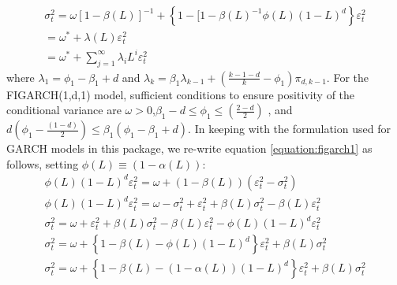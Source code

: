 \begin{equation}\label{equation:figarch1}
\begin{array}{l}
\sigma _t^2 = \omega {\left[ {1 - \beta \left( L \right)} \right]^{ - 1}} + \left\{ {1 - [1 - \beta {{\left( L \right)}^{ - 1}}\phi \left( L \right){{\left( {1 - L} \right)}^d}} \right\}\varepsilon _t^2\\
 = {\omega ^*} + \lambda \left( L \right)\varepsilon _t^2\\
 = {\omega ^*} + \sum\limits_{j = 1}^\infty  {{\lambda _i}{L^i}\varepsilon _t^2}
\end{array}
\end{equation}
where ${\lambda _1} = {\phi _1} - {\beta _1} + d$ and ${\lambda _k} = {\beta _1}{\lambda _{k - 1}} + \left( {\frac{{k - 1 - d}}{k} - {\phi _1}} \right){\pi _{d,k - 1}}$. For the FIGARCH(1,d,1) model, sufficient conditions to ensure positivity of the conditional variance are $\omega  > 0$,${\beta _1} - d \le {\phi _1} \le \left( {\frac{{2 - d}}{2}} \right)$ , and $d\left( {{\phi _1} - \frac{{\left( {1 - d} \right)}}{2}} \right) \le {\beta _1}\left( {{\phi _1} - {\beta _1} + d} \right)$.
In keeping with the formulation used for GARCH models in this package, we re-write equation \ref{equation:figarch1} as follows, setting $\phi \left( L \right) \equiv \left( {1 - \alpha \left( L \right)} \right)$:
\begin{equation}
\begin{array}{l}
\phi \left( L \right){\left( {1 - L} \right)^d}\varepsilon _t^2 = \omega  + \left( {1 - \beta \left( L \right)} \right)\left( {\varepsilon _t^2 - \sigma _t^2} \right)\\
\phi \left( L \right){\left( {1 - L} \right)^d}\varepsilon _t^2 = \omega  - \sigma _t^2 + \varepsilon _t^2 + \beta \left( L \right)\sigma _t^2 - \beta \left( L \right)\varepsilon _t^2\\
\sigma _t^2 = \omega  + \varepsilon _t^2 + \beta \left( L \right)\sigma _t^2 - \beta \left( L \right)\varepsilon _t^2 - \phi \left( L \right){\left( {1 - L} \right)^d}\varepsilon _t^2\\
\sigma _t^2 = \omega  + \left\{ {1 - \beta \left( L \right) - \phi \left( L \right){{\left( {1 - L} \right)}^d}} \right\}\varepsilon _t^2 + \beta \left( L \right)\sigma _t^2\\
\sigma _t^2 = \omega  + \left\{ {1 - \beta \left( L \right) - \left( {1 - \alpha \left( L \right)} \right){{\left( {1 - L} \right)}^d}} \right\}\varepsilon _t^2 + \beta \left( L \right)\sigma _t^2
\end{array}
\end{equation}
